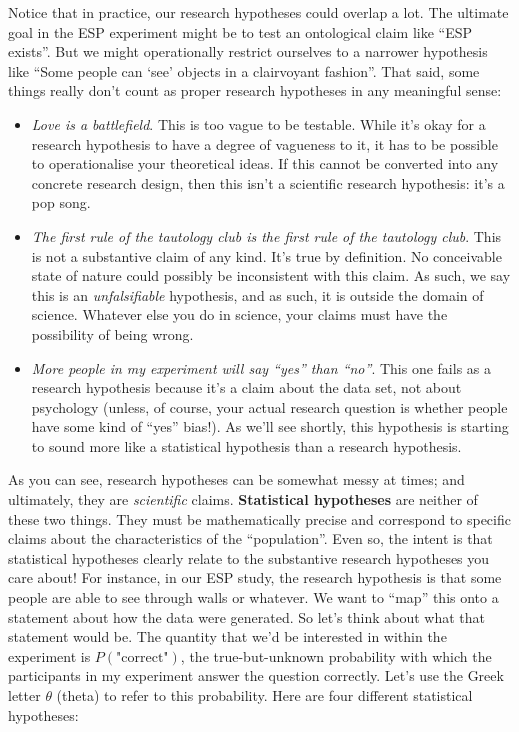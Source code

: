 \documentclass[
]{book}
\providecommand{\tightlist}{%
  \setlength{\itemsep}{0pt}\setlength{\parskip}{0pt}}
\theoremstyle{definition}
\theoremstyle{definition}
\theoremstyle{definition}
\theoremstyle{definition}
\theoremstyle{remark}
\begin{document}
Notice that in practice, our research hypotheses could overlap a lot. The ultimate goal in the ESP experiment might be to test an ontological claim like ``ESP exists''. But we might operationally restrict ourselves to a narrower hypothesis like ``Some people can `see' objects in a clairvoyant fashion''. That said, some things really don't count as proper research hypotheses in any meaningful sense:

\begin{itemize}
\tightlist
\item
  \emph{Love is a battlefield}. This is too vague to be testable. While it's okay for a research hypothesis to have a degree of vagueness to it, it has to be possible to operationalise your theoretical ideas. If this cannot be converted into any concrete research design, then this isn't a scientific research hypothesis: it's a pop song.
\item
  \emph{The first rule of the tautology club is the first rule of the tautology club}. This is not a substantive claim of any kind. It's true by definition. No conceivable state of nature could possibly be inconsistent with this claim. As such, we say this is an \emph{unfalsifiable} hypothesis, and as such, it is outside the domain of science. Whatever else you do in science, your claims must have the possibility of being wrong.
\item
  \emph{More people in my experiment will say ``yes'' than ``no''}. This one fails as a research hypothesis because it's a claim about the data set, not about psychology (unless, of course, your actual research question is whether people have some kind of ``yes'' bias!). As we'll see shortly, this hypothesis is starting to sound more like a statistical hypothesis than a research hypothesis.
\end{itemize}

As you can see, research hypotheses can be somewhat messy at times; and ultimately, they are \emph{scientific} claims. \textbf{Statistical hypotheses} are neither of these two things. They must be mathematically precise and correspond to specific claims about the characteristics of the ``population''. Even so, the intent is that statistical hypotheses clearly relate to the substantive research hypotheses you care about! For instance, in our ESP study, the research hypothesis is that some people are able to see through walls or whatever. We want to ``map'' this onto a statement about how the data were generated. So let's think about what that statement would be. The quantity that we'd be interested in within the experiment is \(P(\mbox{"correct"})\), the true-but-unknown probability with which the participants in my experiment answer the question correctly. Let's use the Greek letter \(\theta\) (theta) to refer to this probability. Here are four different statistical hypotheses:
\end{document}
